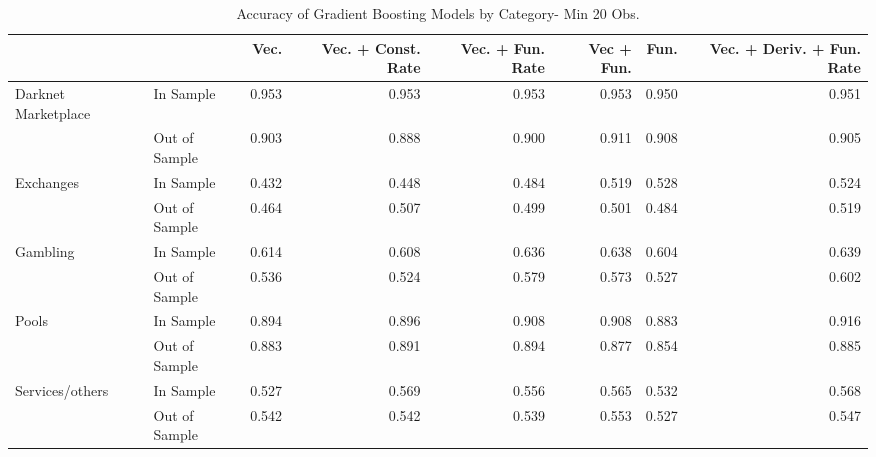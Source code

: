 \begin{table}[ht]
\centering
\begin{tabular}{llrrrrrr}
  \hline
 &  & Vec. & Vec. + Const. Rate & Vec. + Fun. Rate & Vec + Fun. & Fun. & Vec. + Deriv. + Fun. Rate \\ 
  \hline
Darknet Marketplace & In Sample & 0.953 & 0.953 & 0.953 & 0.953 & 0.950 & 0.951 \\ 
   & Out of Sample & 0.903 & 0.888 & 0.900 & 0.911 & 0.908 & 0.905 \\ 
  Exchanges & In Sample & 0.432 & 0.448 & 0.484 & 0.519 & 0.528 & 0.524 \\ 
   & Out of Sample & 0.464 & 0.507 & 0.499 & 0.501 & 0.484 & 0.519 \\ 
  Gambling & In Sample & 0.614 & 0.608 & 0.636 & 0.638 & 0.604 & 0.639 \\ 
   & Out of Sample & 0.536 & 0.524 & 0.579 & 0.573 & 0.527 & 0.602 \\ 
  Pools & In Sample & 0.894 & 0.896 & 0.908 & 0.908 & 0.883 & 0.916 \\ 
   & Out of Sample & 0.883 & 0.891 & 0.894 & 0.877 & 0.854 & 0.885 \\ 
  Services/others & In Sample & 0.527 & 0.569 & 0.556 & 0.565 & 0.532 & 0.568 \\ 
   & Out of Sample & 0.542 & 0.542 & 0.539 & 0.553 & 0.527 & 0.547 \\ 
   \hline
\end{tabular}
\caption{Accuracy of Gradient Boosting Models by Category- Min 20 Obs.} 
\label{gbm_20obs_acc_cat}
\end{table}
